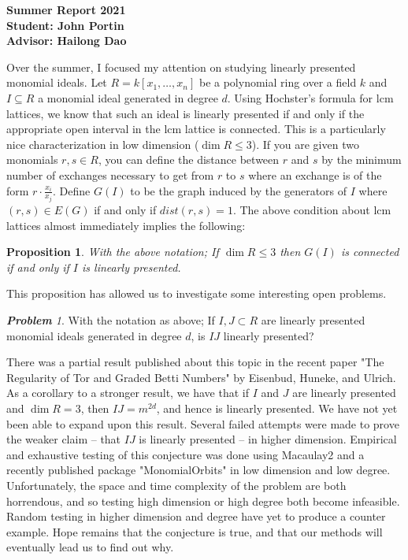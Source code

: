 \documentclass[letter,12pt]{article}
\newtheorem{prop}[thm]{\bf Proposition}
\theoremstyle{definition}
\theoremstyle{remark}
\newtheorem{prob}[thm]{\bf Problem}
\numberwithin{equation}{section}
\begin{document}
\begin{center}
\bf{\Large{Summer Report 2021}} \\
Student: John Portin \\
Advisor: Hailong Dao
\end{center}

Over the summer, I focused my attention on studying linearly presented monomial ideals. Let $R = k[x_1, \dots, x_n]$ be a polynomial ring over a field $k$ and $I \subseteq R$ a monomial ideal generated in degree $d$. Using Hochster's formula for lcm lattices, we know that such an ideal is linearly presented if and only if the appropriate open interval in the lcm lattice is connected. This is a particularly nice characterization in low dimension ($\dim R \leq 3$). If you are given two monomials $r, s \in R$, you can define the distance between $r$ and $s$ by the minimum number of exchanges necessary to get from $r$ to $s$ where an exchange is of the form $r \cdot \frac{x_i}{x_j}$. Define $G(I)$ to be the graph induced by the generators of $I$ where $(r,s) \in E(G)$ if and only if $dist(r,s) = 1$. The above condition about lcm lattices almost immediately implies the following:

\begin{prop}
	With the above notation; If $\dim R \leq 3$ then $G(I)$ is connected if and only if $I$ is linearly presented. 
\end{prop}

This proposition has allowed us to investigate some interesting open problems. 

\begin{prob}
	With the notation as above; If $I, J \subset R$ are linearly presented monomial ideals generated in degree $d$, is $IJ$ linearly presented?
\end{prob}

There was a partial result published about this topic in the recent paper "The Regularity of Tor and Graded Betti Numbers" by Eisenbud, Huneke, and Ulrich. As a corollary to a stronger result, we have that if $I$ and $J$ are linearly presented and $\dim R = 3$, then $IJ = m^{2d}$, and hence is linearly presented. We have not yet been able to expand upon this result. Several failed attempts were made to prove the weaker claim -- that $IJ$ is linearly presented -- in higher dimension. Empirical and exhaustive testing of this conjecture was done using Macaulay2 and a recently published package "MonomialOrbits" in low dimension and low degree. Unfortunately, the space and time complexity of the problem are both horrendous, and so testing high dimension or high degree both become infeasible. Random testing in higher dimension and degree have yet to produce a counter example. Hope remains that the conjecture is true, and that our methods will eventually lead us to find out why. 
\end{document}
